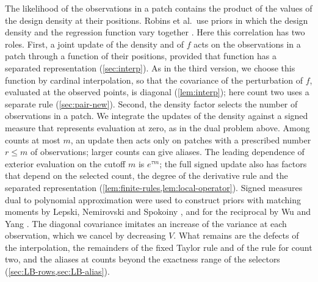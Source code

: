 The likelihood of the observations in a patch contains the product of
the values of the design density at their positions. Robins et al.\
use priors in which the design density and the regression function
vary together \cite[Section~3]{RobinsEtAl2009EJS}. Here this
correlation has two roles. First, a joint update of the density and
of $f$ acts on the observations in a patch through a function of their
positions, provided that function has a separated representation
(\cref{sec:interp}). As in the third version, we choose this function by cardinal
interpolation, so that the covariance of the perturbation of $f$,
evaluated at the observed points, is diagonal (\cref{lem:interp}); here
count two uses a separate rule (\cref{sec:pair-new}). Second, the density factor
selects the number of observations in a patch. We integrate the updates of the density against
a signed measure that represents evaluation at zero, as in the dual
problem above. Among counts at most $m$, an update then acts only on
patches with a prescribed number $r\le m$ of observations; larger counts
can give aliases. The leading dependence of exterior evaluation on the cutoff
$m$ is $e^{\tau m}$; the full signed update also has factors that depend
on the selected count, the degree of the derivative rule and the
separated representation (\cref{lem:finite-rules,lem:local-operator}). Signed
measures dual to polynomial approximation were used to construct priors
with matching moments by Lepski, Nemirovski and Spokoiny
\cite[Section~4.4]{LepskiEtAl1999}, and for the reciprocal by Wu and
Yang \cite[Appendix~A]{WuYang2019}. The diagonal covariance imitates an
increase of the variance at each observation, which we cancel by
decreasing $V$. What remains are the defects of the interpolation,
the remainders of the fixed Taylor rule and of the rule for count two,
and the aliases at counts beyond the exactness range of the selectors
(\cref{sec:LB-rows,sec:LB-alias}).

